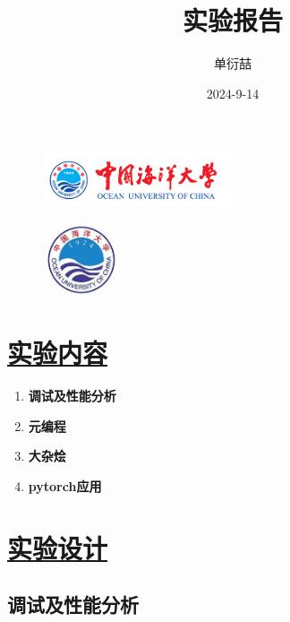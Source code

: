 \documentclass[a4paper,12pt]{article}
\begin{document}
\begin{figure}[t]
    \includegraphics[width=0.5\textwidth]{ouc2.png}
\end{figure}

\title{\textbf{实验报告}}
\author{单衍喆 }
\date{2024-9-14}
\maketitle


\newpage
\begin{figure}[t]
    \includegraphics[width=0.2\textwidth]{ouc.jpg}
\end{figure}

\tableofcontents
\newpage
{}


\section{\underline{\color{blue}实验内容}}

\begin{enumerate}
    \item \textbf{调试及性能分析}
    \item \textbf{元编程}
    \item \textbf{大杂烩}
    \item \textbf{pytorch应用}
\end{enumerate}

\section{\underline{\color{blue}实验设计}}

\subsection{\color{red}调试及性能分析}
\end{document}
